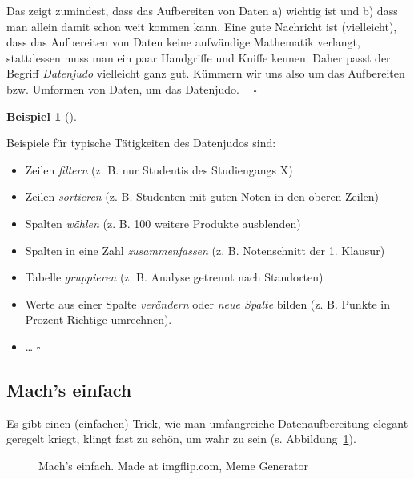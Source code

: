 \documentclass[
  a4paper,
  DIV=11]{scrreprt}
\providecommand{\tightlist}{%
  \setlength{\itemsep}{0pt}\setlength{\parskip}{0pt}}\usepackage{longtable,booktabs,array}
\theoremstyle{definition}
\theoremstyle{definition}
\newtheorem{example}{Beispiel}[chapter]
\theoremstyle{definition}
\theoremstyle{remark}
\begin{document}
Das zeigt zumindest, dass das Aufbereiten von Daten a) wichtig ist und
b) dass man allein damit schon weit kommen kann. Eine gute Nachricht ist
(vielleicht), dass das Aufbereiten von Daten keine aufwändige Mathematik
verlangt, stattdessen muss man ein paar Handgriffe und Kniffe kennen.
Daher passt der Begriff \emph{Datenjudo} vielleicht ganz gut. Kümmern
wir uns also um das Aufbereiten bzw. Umformen von Daten, um das
Datenjudo. 🔢🤹 \(\square\)

\begin{example}[]\protect\hypertarget{exm-datenjudo}{}\label{exm-datenjudo}

Beispiele für typische Tätigkeiten des Datenjudos sind:

\begin{itemize}
\tightlist
\item
  Zeilen \emph{filtern} (z. B. nur Studentis des Studiengangs X)
\item
  Zeilen \emph{sortieren} (z. B. Studenten mit guten Noten in den oberen
  Zeilen)
\item
  Spalten \emph{wählen} (z. B. 100 weitere Produkte ausblenden)
\item
  Spalten in eine Zahl \emph{zusammenfassen} (z. B. Notenschnitt der 1.
  Klausur)
\item
  Tabelle \emph{gruppieren} (z. B. Analyse getrennt nach Standorten)
\item
  Werte aus einer Spalte \emph{verändern} oder \emph{neue Spalte} bilden
  (z. B. Punkte in Prozent-Richtige umrechnen).
\item
  \ldots{} \(\square\)
\end{itemize}

\end{example}

\subsection{Mach's einfach}\label{machs-einfach}

Es gibt einen (einfachen) Trick, wie man umfangreiche Datenaufbereitung
elegant geregelt kriegt, klingt fast zu schön, um wahr zu sein (s.
Abbildung~\ref{fig-that-would-be-great}).

\begin{figure}


\caption{\label{fig-that-would-be-great}Mach's einfach. Made at
imgflip.com, Meme Generator}

\end{figure}%
\end{document}
